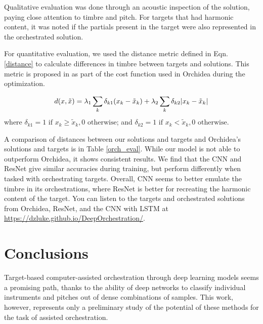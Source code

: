 \documentclass[runningheads,a4paper]{llncs}
\begin{document}

Qualitative evaluation was done through an acoustic inspection of the solution, paying close attention to timbre and pitch. For targets that had harmonic content, it was noted if the partials present in the target were also represented in the orchestrated solution.

For quantitative evaluation, we used the distance metric defined in Eqn. \ref{distance} to calculate differences in timbre between targets and solutions. This metric is proposed in \cite{Cella2020} as part of the cost function used in Orchidea during the optimization. 

\begin{equation}\label{distance}
d(x, \tilde{x}) =\lambda_1 \sum_k \delta_{k1}(x_k - \tilde{x}_k) + \lambda_2 \sum_k \delta_{k2}|x_k - \tilde{x	}_k| \\
\end{equation}
where $\delta_{k1} = 1 \text{  if  } x_k \ge \tilde{x}_k, 0 \text{  otherwise}$; and $\delta_{k2} = 1 \text{  if  } x_k < \tilde{x}_k, 0 \text{  otherwise}$.

A comparison of distances between our solutions and targets and Orchidea's solutions and targets is in Table \ref{orch_eval}. While our model is not able to outperform Orchidea, it shows consistent results. We find that the CNN and ResNet give similar accuracies during training, but perform differently when tasked with orchestrating targets. Overall, CNN seems to better emulate the timbre in its orchestrations, where ResNet is better for recreating the harmonic content of the target. You can listen to the targets and orchestrated solutions from Orchidea, ResNet, and the CNN with LSTM at \url{https://dzluke.github.io/DeepOrchestration/}.

\section{Conclusions}
\label{sec:conclusions}

Target-based computer-assisted orchestration through deep learning models seems a promising path, thanks to the ability of deep networks to classify individual instruments and pitches out of dense combinations of samples. This work, however, represents only a preliminary study of the potential of these methods for the task of assisted orchestration. 
\end{document}
